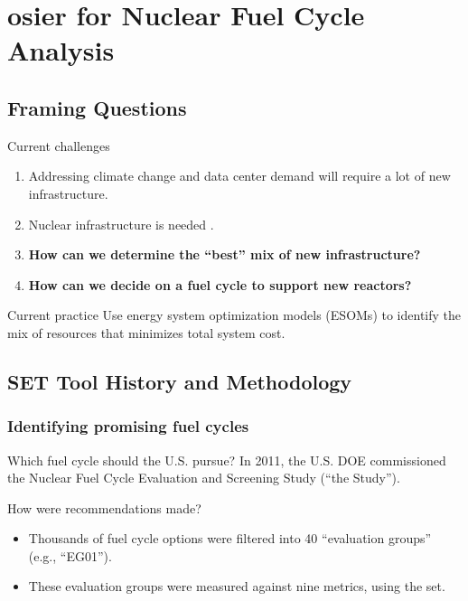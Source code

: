 \section{\gls{osier} for Nuclear Fuel Cycle Analysis}

\subsection{Framing Questions}
\begin{frame}
    \begin{block}{Current challenges}
    \begin{enumerate}[<+->]
        \item Addressing climate change and data center demand will require a
        lot of new infrastructure.
        \item Nuclear infrastructure is needed
        \cite{julie_kozeracki_pathways_2024}.
        \item \textbf{How can we determine the ``best'' mix of new
        infrastructure?}
        \item \textbf{How can we decide on a fuel cycle to support new
        reactors?}
    \end{enumerate}    
    \end{block}
    \pause
    \begin{block}{Current practice}
        Use energy system optimization models (ESOMs) to identify the mix of
        resources that minimizes total system cost.
    \end{block}
\end{frame}

\subsection{SET Tool History and Methodology}
\begin{frame}
    \frametitle{Identifying promising fuel cycles}
    \begin{block}{Which fuel cycle should the U.S. pursue?}
        In 2011, the U.S. \Gls{DOE} commissioned the Nuclear Fuel Cycle
        Evaluation and Screening Study (``the Study'').
    \end{block}
    \pause
    \begin{block}{How were recommendations made?}
        \begin{itemize}[<+->]
            \item Thousands of fuel cycle options were filtered into 40
            ``evaluation groups'' (e.g., ``EG01'').
            \item These evaluation groups were measured against nine metrics,
            using the \gls{set}.
        \end{itemize}
    \end{block}
\end{frame}

